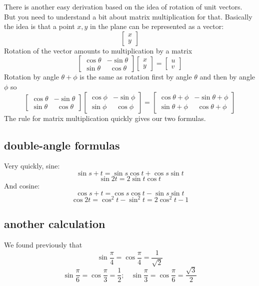 \documentclass[11pt, oneside]{article}
\begin{document}
There is another easy derivation based on the idea of rotation of unit vectors.  But you need to understand a bit about matrix multiplication for that.  Basically the idea is that a point $x,y$ in the plane can be represented as a vector:
\[ 
\begin{bmatrix}
x \\
y
\end{bmatrix}
\]
Rotation of the vector amounts to multiplication by a matrix
\[
\begin{bmatrix}  
\cos \theta & -\sin \theta \\
\sin \theta & \ \  \cos \theta 
\end{bmatrix}
\begin{bmatrix}  x \\ y \end{bmatrix}
=
\begin{bmatrix}  u \\ v \end{bmatrix}
\]
Rotation by angle $\theta + \phi$ is the same as rotation first by angle $\theta$ and then by angle $\phi$ so
\[
\begin{bmatrix}  
\cos \theta & -\sin \theta \\
\sin \theta & \ \  \cos \theta 
\end{bmatrix}
\begin{bmatrix}  
\cos \phi & -\sin \phi \\
\sin \phi & \ \  \cos \phi 
\end{bmatrix}
=
\begin{bmatrix}  
\cos \theta + \phi & -\sin \theta + \phi \\
\sin \theta + \phi & \ \  \cos \theta + \phi
\end{bmatrix}
\]
The rule for matrix multiplication quickly gives our two formulas.

\subsection*{double-angle formulas}
Very quickly, sine:
\[ \sin s + t = \sin s \cos t + \cos s \sin t \]
\[ \sin 2t = 2 \sin t \cos t \]
And cosine:
\[ \cos s + t = \cos s \cos t - \sin s \sin t \]
\[ \cos 2t = \cos^2 t - \sin^2 t = 2 \cos^2 t - 1 \]

\subsection*{another calculation}
We found previously that 
\[ \sin \frac{\pi}{4} = \cos \frac{\pi}{4} = \frac{1}{\sqrt{2}} \]
\[ \sin \frac{\pi}{6} = \cos \frac{\pi}{3} = \frac{1}{2}; \ \ \ \ \sin \frac{\pi}{3} = \cos \frac{\pi}{6} = \frac{\sqrt{3}}{2} \]
\end{document}
